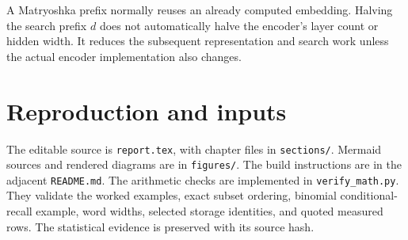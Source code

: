A Matryoshka prefix normally reuses an already computed embedding. Halving the search prefix
$d$ does not automatically halve the encoder's layer count or hidden width. It reduces the
subsequent representation and search work unless the actual encoder implementation also changes.

\section{Reproduction and inputs}
The editable source is \texttt{report.tex}, with chapter files in \texttt{sections/}. Mermaid
sources and rendered diagrams are in \texttt{figures/}. The build instructions are in the
adjacent \texttt{README.md}. The arithmetic checks are implemented in \texttt{verify\_math.py}.
They validate the worked examples, exact subset ordering, binomial conditional-recall example,
word widths, selected storage identities, and quoted measured rows. The statistical evidence
is preserved with its source hash.

